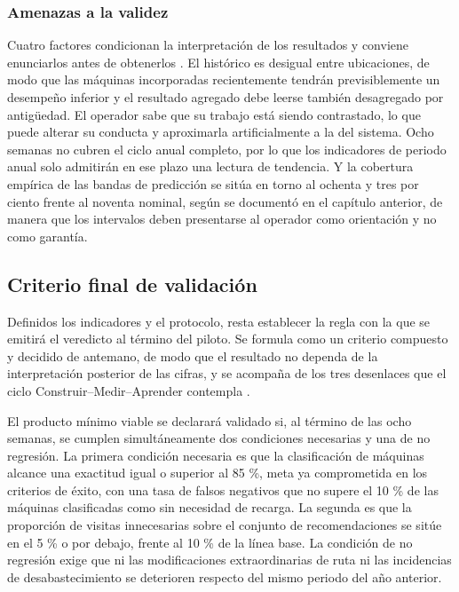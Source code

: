 \subsubsection{Amenazas a la validez}\label{amenazas-a-la-validez}

Cuatro factores condicionan la interpretación de los resultados y conviene enunciarlos antes de obtenerlos \citep{shadish2002}. El histórico es desigual entre ubicaciones, de modo que las máquinas incorporadas recientemente tendrán previsiblemente un desempeño inferior y el resultado agregado debe leerse también desagregado por antigüedad. El operador sabe que su trabajo está siendo contrastado, lo que puede alterar su conducta y aproximarla artificialmente a la del sistema. Ocho semanas no cubren el ciclo anual completo, por lo que los indicadores de periodo anual solo admitirán en ese plazo una lectura de tendencia. Y la cobertura empírica de las bandas de predicción se sitúa en torno al ochenta y tres por ciento frente al noventa nominal, según se documentó en el capítulo anterior, de manera que los intervalos deben presentarse al operador como orientación y no como garantía.

\subsection{Criterio final de validación}\label{criterio-final-de-validacion}

Definidos los indicadores y el protocolo, resta establecer la regla con la que se emitirá el veredicto al término del piloto. Se formula como un criterio compuesto y decidido de antemano, de modo que el resultado no dependa de la interpretación posterior de las cifras, y se acompaña de los tres desenlaces que el ciclo Construir--Medir--Aprender contempla \citep{ries2011}.

El producto mínimo viable se declarará validado si, al término de las ocho semanas, se cumplen simultáneamente dos condiciones necesarias y una de no regresión. La primera condición necesaria es que la clasificación de máquinas alcance una exactitud igual o superior al 85 \%, meta ya comprometida en los criterios de éxito, con una tasa de falsos negativos que no supere el 10 \% de las máquinas clasificadas como sin necesidad de recarga. La segunda es que la proporción de visitas innecesarias sobre el conjunto de recomendaciones se sitúe en el 5 \% o por debajo, frente al 10 \% de la línea base. La condición de no regresión exige que ni las modificaciones extraordinarias de ruta ni las incidencias de desabastecimiento se deterioren respecto del mismo periodo del año anterior.

